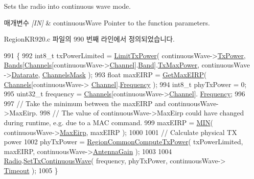Sets the radio into continuous wave mode. 


\begin{DoxyParams}{매개변수}
{\em \mbox{[}\+I\+N\mbox{]}} & continuous\+Wave Pointer to the function parameters. \\
\hline
\end{DoxyParams}


Region\+K\+R920.\+c 파일의 990 번째 라인에서 정의되었습니다.


\begin{DoxyCode}
991 \{
992     int8\_t txPowerLimited = \mbox{\hyperlink{_region_k_r920_8c_af2821991c6e6dad3e196b01f6cf1d542}{LimitTxPower}}( continuousWave->\mbox{\hyperlink{structs_continuous_wave_params_a037b4f849fa8ed4aa1d3c58aef2b28ec}{TxPower}}, 
      \mbox{\hyperlink{_region_k_r920_8c_a12f2ea1fb6e7f8812338a8192ce15797}{Bands}}[\mbox{\hyperlink{_region_k_r920_8c_aa22cc2ed5f1e155ccf4f0c0388da513e}{Channels}}[continuousWave->\mbox{\hyperlink{structs_continuous_wave_params_a1ca6f01ca18afe402de51babe8c95f5e}{Channel}}].\mbox{\hyperlink{structs_channel_params_a724c03aa06953111c3291243831f251b}{Band}}].\mbox{\hyperlink{structs_band_a1b9d27384fedab3a94167b8e9bf9b432}{TxMaxPower}}, continuousWave
      ->\mbox{\hyperlink{structs_continuous_wave_params_ae2f6080f3aa0e9485c55513ca56bb24d}{Datarate}}, \mbox{\hyperlink{_region_k_r920_8c_a2188957b5ca6af8092154d7ccbfa5757}{ChannelsMask}} );
993     \textcolor{keywordtype}{float} maxEIRP = \mbox{\hyperlink{_region_k_r920_8c_a57ad10a17dfe52c07d7aea086766da89}{GetMaxEIRP}}( \mbox{\hyperlink{_region_k_r920_8c_aa22cc2ed5f1e155ccf4f0c0388da513e}{Channels}}[continuousWave->
      \mbox{\hyperlink{structs_continuous_wave_params_a1ca6f01ca18afe402de51babe8c95f5e}{Channel}}].\mbox{\hyperlink{structs_channel_params_ade3d190636488dad9a89b19446b7acf1}{Frequency}} );
994     int8\_t phyTxPower = 0;
995     uint32\_t frequency = \mbox{\hyperlink{_region_k_r920_8c_aa22cc2ed5f1e155ccf4f0c0388da513e}{Channels}}[continuousWave->\mbox{\hyperlink{structs_continuous_wave_params_a1ca6f01ca18afe402de51babe8c95f5e}{Channel}}].
      \mbox{\hyperlink{structs_channel_params_ade3d190636488dad9a89b19446b7acf1}{Frequency}};
996 
997     \textcolor{comment}{// Take the minimum between the maxEIRP and continuousWave->MaxEirp.}
998     \textcolor{comment}{// The value of continuousWave->MaxEirp could have changed during runtime, e.g. due to a MAC command.}
999     maxEIRP = \mbox{\hyperlink{utilities_8h_a3acffbd305ee72dcd4593c0d8af64a4f}{MIN}}( continuousWave->\mbox{\hyperlink{structs_continuous_wave_params_abacf3c28f803460c8947f0b0077fcf5c}{MaxEirp}}, maxEIRP );
1000 
1001     \textcolor{comment}{// Calculate physical TX power}
1002     phyTxPower = \mbox{\hyperlink{group___r_e_g_i_o_n_c_o_m_m_o_n_gaa92800c8e9ce21366d383d14878cc391}{RegionCommonComputeTxPower}}( txPowerLimited, maxEIRP, 
      continuousWave->\mbox{\hyperlink{structs_continuous_wave_params_a727eaefd87f898a5238118573968962c}{AntennaGain}} );
1003 
1004     \mbox{\hyperlink{sx1276mb1las_8c_acf9fe61a72c16fa29a0dc449d23e3820}{Radio}}.\mbox{\hyperlink{struct_radio__s_a33dccb0bc830d9a68ec0c2e75b74e541}{SetTxContinuousWave}}( frequency, phyTxPower, continuousWave->
      \mbox{\hyperlink{structs_continuous_wave_params_ae1c58f120c7eef7bb71a5e3bfeaeb795}{Timeout}} );
1005 \}
\end{DoxyCode}
